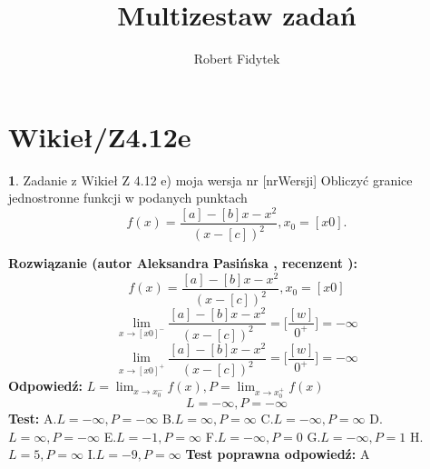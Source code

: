 \documentclass[12pt, a4paper]{article}
\title{Multizestaw zadań}
\author{Robert Fidytek}
\date{}
\theoremstyle{definition} %
\newtheorem{zad}{}
\newcommand{\kategoria}[1]{\section{#1}} %
\newcommand{\zadStart}[1]{\begin{zad}#1\newline} %
\newcommand{\zadStop}{\end{zad}}   %
\newcommand{\rozwStart}[2]{\noindent \textbf{Rozwiązanie (autor #1 , recenzent #2): }\newline} %
\newcommand{\rozwStop}{\newline}                                            %
\newcommand{\odpStart}{\noindent \textbf{Odpowiedź:}\newline}    %
\newcommand{\odpStop}{\newline}                                             %
\newcommand{\testStart}{\noindent \textbf{Test:}\newline} %
\newcommand{\testStop}{\newline} %
\newcommand{\kluczStart}{\noindent \textbf{Test poprawna odpowiedź:}\newline} %
\newcommand{\kluczStop}{\newline} %
\begin{document}
\maketitle


\kategoria{Wikieł/Z4.12e}
\zadStart{Zadanie z Wikieł Z 4.12 e) moja wersja nr [nrWersji]}
Obliczyć granice jednostronne funkcji w podanych punktach $$f(x)=\frac{[a]-[b]x-x^2}{(x-[c])^2},x_{0}=[x0].$$
\zadStop
\rozwStart{Aleksandra Pasińska}{}
$$f(x)=\frac{[a]-[b]x-x^2}{(x-[c])^2},x_{0}=[x0]$$
$$\lim_{x\rightarrow [x0]^-}\frac{[a]-[b]x-x^2}{(x-[c])^2}=\biggl[\frac{[w]}{0^+}\biggr]=-\infty$$ 
$$\lim_{x\rightarrow [x0]^+}\frac{[a]-[b]x-x^2}{(x-[c])^2}=\biggl[\frac{[w]}{0^+}\biggr]=-\infty$$ 
\rozwStop
\odpStart
$ L=\lim_{x\rightarrow x_{0}^-}f(x), P=\lim_{x\rightarrow x_{0}^+}f(x)$
$$L=-\infty, P=-\infty$$
\odpStop
\testStart
A.$ L=-\infty, P=-\infty $
B.$L=\infty, P=\infty$
C.$L=-\infty, P=\infty$
D.$L=\infty, P=-\infty$
E.$L=-1, P=\infty$
F.$L=-\infty, P=0$
G.$L=-\infty, P=1$
H.$L=5, P=\infty$
I.$L=-9, P=\infty$
\testStop
\kluczStart
A
\kluczStop
\end{document}

